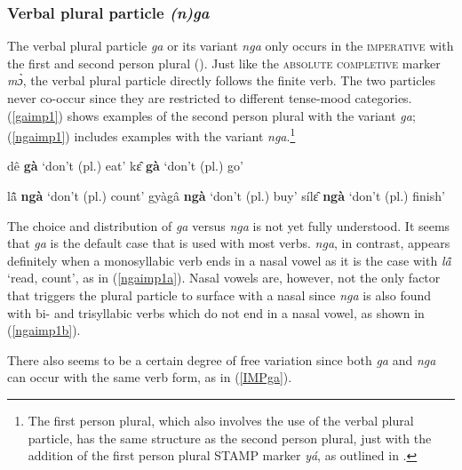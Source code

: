 \subsubsection{Verbal plural particle {\itshape (n)ga}}
\label{sec:nga}

The verbal plural particle {\itshape ga} or its variant {\itshape nga} only occurs in the \textsc{imperative} with the first and second person plural (). Just like the \textsc{absolute completive} marker {\itshape mɔ̀}, the verbal plural particle directly follows the finite verb. The two particles never co-occur since they are restricted to different tense-mood categories. (\ref{gaimp1}) shows examples of the second person plural with the variant {\itshape ga}; (\ref{ngaimp1}) includes examples with the variant {\itshape nga}.\footnote{The first person plural, which also involves the use of the verbal plural particle, has the same structure as the second person plural, just with the addition of the first person plural STAMP marker {\itshape yá}, as outlined in .}

\begin{exe}
\ex\label{gaimp1}
\begin{xlist}
\ex dê {\bfseries gà} `don't (pl.) eat'
\ex kɛ̂ {\bfseries gà} `don't (pl.) go'
\end{xlist}
\end{exe}


\begin{exe}
\ex\label{ngaimp1}
\begin{xlist}
\ex\label{ngaimp1a} lã̂ {\bfseries ngà} `don't (pl.) count'
\ex\label{ngaimp1b} gyàgâ {\bfseries ngà} `don't (pl.) buy'
\ex sílɛ̂ {\bfseries ngà} `don't (pl.) finish'
\end{xlist}
\end{exe}


The choice and distribution of {\itshape ga} versus {\itshape nga} is not yet fully understood. It seems that {\itshape ga} is the default case that is used with most verbs. {\itshape nga}, in contrast, appears definitely when a monosyllabic verb ends in a nasal vowel as it is the case with {\itshape lã̂}  `read, count', as in (\ref{ngaimp1a}). Nasal vowels are, however, not the only factor that triggers the plural particle to surface with a nasal since {\itshape nga} is also found with bi- and trisyllabic verbs which do not end in a nasal vowel, as shown in (\ref{ngaimp1b}).



There also seems to be a certain degree of free variation since both {\itshape ga} and {\itshape nga} can occur with the same verb form, as in (\ref{IMPga}).

